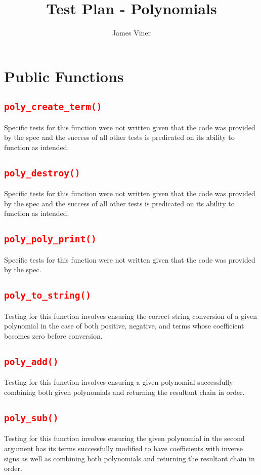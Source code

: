 \documentclass[11pt]{report}
\begin{document}
\title{Test Plan - Polynomials}
\author{James Viner}
\date{} %
\maketitle

\doublespacing

\pagebreak
\section*{Public Functions}
\subsection*{\texttt{\textcolor{red}{poly\_create\_term()}}}
Specific tests for this function were not written given that the code was provided by the spec and the success of all other tests is predicated on its ability to function as intended.
\subsection*{\texttt{\textcolor{red}{poly\_destroy()}}}
Specific tests for this function were not written given that the code was provided by the spec and the success of all other tests is predicated on its ability to function as intended.
\subsection*{\texttt{\textcolor{red}{poly\_poly\_print()}}}
Specific tests for this function were not written given that the code was provided by the spec.
\subsection*{\texttt{\textcolor{red}{poly\_to\_string()}}}
Testing for this function involves ensuring the correct string conversion of a given polynomial in the case of both positive, negative, and terms whose coefficient becomes zero before conversion.
\subsection*{\texttt{\textcolor{red}{poly\_add()}}}
Testing for this function involves ensuring a given polynomial successfully combining both given polynomials and returning the resultant chain in order.
\subsection*{\texttt{\textcolor{red}{poly\_sub()}}}
Testing for this function involves ensuring the given polynomial in the second argument has its terms successfully modified to have coefficients with inverse signs as well as combining both polynomials and returning the resultant chain in order.
\end{document}
